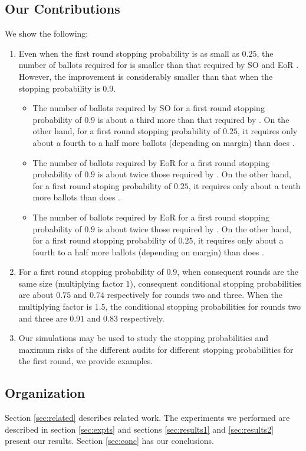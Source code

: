 \subsection{Our Contributions}
We show the following: 
\begin{enumerate}
\item Even when the first round stopping probability is as small as $0.25$, the number of ballots required for \Minerva is smaller than that required by SO \BRAVO and EoR \BRAVO. However, the improvement is considerably smaller than that when the stopping probability is $0.9$. 
\begin{itemize}
<<<<<<< HEAD
\item The number of ballots required by SO \BRAVO for a first round stopping probability of $0.9$ is about a third more than that required by \Minerva. On the other hand, for a first round stopping probability of $0.25$, it requires only about a fourth to a half more ballots (depending on margin) than does \Minerva.  
\item The number of ballots required by EoR \BRAVO for a first round stopping probability of $0.9$ is about twice those required by \Minerva. On the other hand, for a first round stoping probability of $0.25$, it requires only about a tenth more ballots than does \Minerva.  
\item The number of ballots required by EoR \BRAVO for a first round stopping probability of $0.9$ is about twice those required by \Minerva. On the other hand, for a first round stopping probability of $0.25$, it requires only about a fourth to a half more ballots (depending on margin) than does \Minerva.  
\end{itemize}
\item For a first round stopping probability of $0.9$, when consequent \Minerva rounds are the same size (multiplying factor $1$), consequent conditional stopping probabilities are about $0.75$ and $0.74$ respectively for rounds two and three. When the multiplying factor is $1.5$, the conditional stopping probabilities for rounds two and three are $0.91$ and $0.83$ respectively. 
\item Our simulations may be used to study the stopping probabilities and maximum risks of the different audits for different stopping probabilities for the first round, we provide examples. 
\end{enumerate}

\subsection{Organization} Section \ref{sec:related} describes related work. The experiments we performed are described in section \ref{sec:expts} and sections \ref{sec:results1} and \ref{sec:results2} present our results. Section \ref{sec:conc} has our conclusions. 

